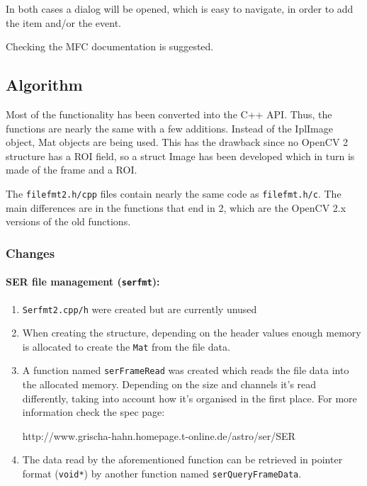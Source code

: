 \documentclass[a4paper,11pt]{memoir}
\begin{document}
In both cases a dialog will be opened, which is easy to navigate, in order to add the item and/or the event.

Checking the MFC documentation is suggested.

\subsection{Algorithm}

Most of the functionality has been converted into the C++ API. Thus, the functions are nearly the same with a few additions. Instead of the IplImage object, Mat objects are being used. This
has the drawback since no OpenCV 2 structure has a ROI field, so a struct Image has been developed which in turn is made of the frame and a ROI.

The \texttt{filefmt2.h/cpp} files contain nearly the same code as \texttt{filefmt.h/c}. The main differences are in the functions that end in 2, which are the OpenCV 2.x versions of the old functions.

\subsubsection{Changes}
\paragraph{SER file management (\texttt{serfmt}):}
\begin{enumerate}
\item \texttt{Serfmt2.cpp/h} were created but are currently unused
\item When creating the structure, depending on the header values enough memory is allocated to create the \texttt{Mat} from the file data.
\item A function named \texttt{serFrameRead} was created which reads the file data into the allocated memory. Depending on the size and channels it’s read differently, taking into account how it’s organised in the first place. For more information check the spec page: 

http://www.grischa-hahn.homepage.t-online.de/astro/ser/SER%

\item The data read by the aforementioned function can be retrieved in pointer format (\texttt{void*}) by another function named \texttt{serQueryFrameData}.
\end{enumerate}
\end{document}

